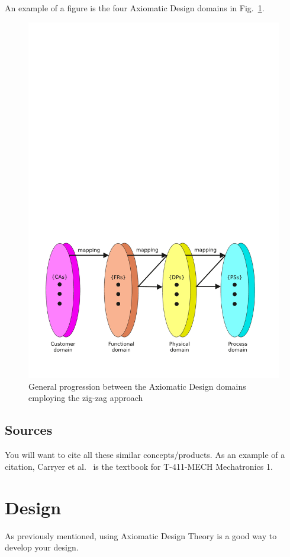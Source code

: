 \documentclass[sn-mathphys,pdflatex]{sn-jnl}%
\theoremstyle{thmstyleone}%
\theoremstyle{thmstyletwo}%
\theoremstyle{thmstylethree}%
\begin{document}
An example of a figure is the four Axiomatic Design domains in Fig.~\ref{fig:ad-domains}.
\begin{figure}
  \centering
  \includegraphics[width=0.9\columnwidth]{ad-domains-zig}
  \caption{General progression between the Axiomatic Design domains employing the zig-zag approach}\label{fig:ad-domains}
\end{figure}



\subsection{Sources}\label{sec:sources}
You will want to cite all these similar concepts/products.
As an example of a citation, Carryer et al.~\cite{carryer2011IntroMechatronics} is the textbook for T-411-MECH Mechatronics 1.


\section{Design}\label{sec:design}
As previously mentioned, using Axiomatic Design Theory is a good way to develop your design.
\end{document}
